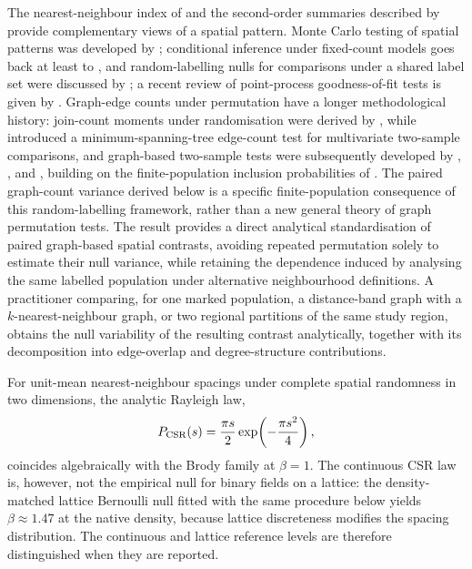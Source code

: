 \documentclass[final,1p,times,authoryear]{elsarticle}
\theoremstyle{definition}
\begin{document}
The nearest-neighbour index of \citet{CLARK-EVANS-1954} and the second-order
summaries described by \citet{RIPLEY-1981} provide complementary views of a
spatial pattern. Monte Carlo testing of spatial patterns was developed by
\citet{BESAG-DIGGLE-1977}; conditional inference under fixed-count models goes
back at least to \citet{RIPLEY-1977-MODELLING}, and random-labelling nulls for
comparisons under a shared label set were discussed by
\citet{GOREAUD-PELISSIER-2003}; a recent review of point-process
goodness-of-fit tests is given by \citet{FEND-REDENBACH-2025}. Graph-edge
counts under permutation have a longer methodological history: join-count
moments under randomisation were derived by \citet{MORAN-1948}, while
\citet{FRIEDMAN-RAFSKY-1979} introduced a minimum-spanning-tree edge-count
test for multivariate two-sample comparisons, and graph-based two-sample
tests were subsequently developed by \citet{HENZE-1988}, \citet{SCHILLING-1986},
\citet{MAA-PEARL-BARTOSZYNSKI-1996} and \citet{CHEN-FRIEDMAN-2017}, building on
the finite-population inclusion probabilities of
\citet{HORVITZ-THOMPSON-1952}. The paired graph-count variance derived below
is a specific finite-population consequence of this random-labelling
framework, rather than a new general theory of graph permutation tests. The
result provides a direct analytical standardisation of paired graph-based
spatial contrasts, avoiding repeated permutation solely to estimate their null
variance, while retaining the dependence induced by analysing the same
labelled population under alternative neighbourhood definitions. A
practitioner comparing, for one marked population, a distance-band graph with
a $k$-nearest-neighbour graph, or two regional partitions of the same study
region, obtains the null variability of the resulting contrast analytically,
together with its decomposition into edge-overlap and degree-structure
contributions.

For unit-mean nearest-neighbour spacings under complete spatial randomness in
two dimensions, the analytic Rayleigh law,
\begin{equation}
P_{\rm CSR}(s)=\frac{\pi s}{2}\exp\!\left(-\frac{\pi s^2}{4}\right),
\label{eq:rayleigh}
\end{equation}
coincides algebraically with the Brody family at $\beta=1$. The continuous CSR
law is, however, not the empirical null for binary fields on a lattice: the
density-matched lattice Bernoulli null fitted with the same procedure below
yields $\beta\approx1.47$ at the native density, because lattice discreteness
modifies the spacing distribution. The continuous and lattice reference
levels are therefore distinguished when they are reported.
\end{document}
